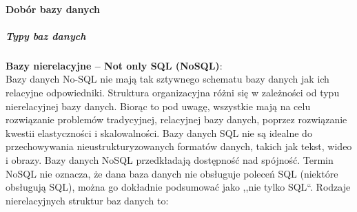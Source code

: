 \documentclass[12pt, a4paper, twoside, openany]{book}
\begin{document}
\paragraph{Dobór bazy danych}

\subparagraph{Typy baz danych\\}

\textbf{Bazy nierelacyjne -- Not only SQL (NoSQL)}:\\
Bazy danych No-SQL nie mają tak sztywnego schematu bazy danych jak ich relacyjne odpowiedniki. Struktura organizacyjna różni się w zależności od typu nierelacyjnej bazy danych. Biorąc to pod uwagę, wszystkie mają na celu rozwiązanie problemów tradycyjnej, relacyjnej bazy danych, poprzez rozwiązanie kwestii elastyczności i skalowalności. Bazy danych SQL nie są idealne do przechowywania nieustrukturyzowanych formatów danych, takich jak tekst, wideo i obrazy. Bazy danych NoSQL przedkładają dostępność nad spójność.
Termin NoSQL nie oznacza, że dana baza danych nie obsługuje poleceń SQL (niektóre obsługują SQL), można go dokładnie podsumować jako ,,nie tylko SQL``.
Rodzaje nierelacyjnych struktur baz danych to:
\end{document}
